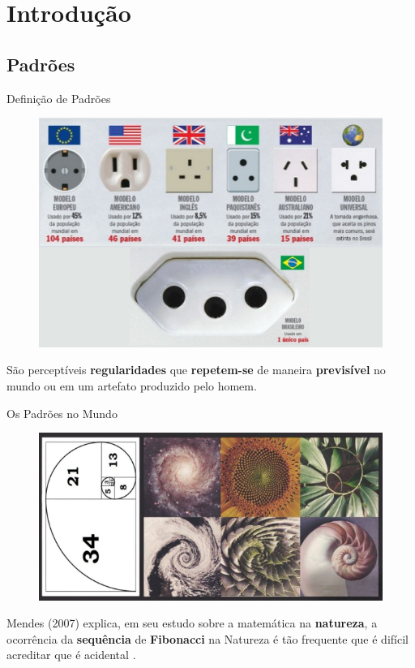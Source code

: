 \section{Introdução}

\subsection{Padrões}
    \begin{frame}[fragile]{Definição de Padrões}
        \begin{figure}[H]
        \begin{center}
            \includegraphics[scale=0.50]{images/padroes.png}
        \end{center}
        \end{figure}

        São perceptíveis \textbf{regularidades} que \textbf{repetem-se} de 
        maneira \textbf{previsível} no mundo ou em um artefato produzido pelo 
        homem.
    \end{frame}

    \begin{frame}[fragile]{Os Padrões no Mundo}
        \begin{figure}[H]
        \begin{center}
            \includegraphics[scale=0.60]{images/padroes_mundo.png}
        \end{center}
        \end{figure}

        Mendes (2007) explica, em seu estudo sobre a matemática na
        \textbf{natureza}, a ocorrência da \textbf{sequência} de
        \textbf{Fibonacci} na Natureza é tão frequente que é difícil acreditar
        que é acidental \cite{mendes2007matematica}.
    \end{frame}

